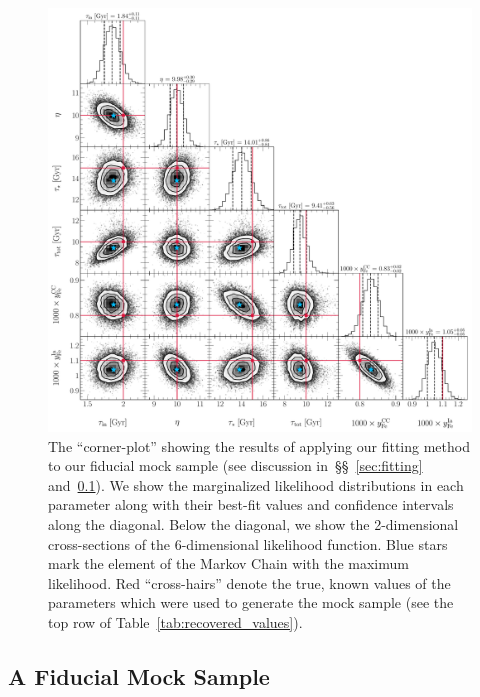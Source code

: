 \documentclass[ms.tex]{subfiles}
\begin{document}
\begin{figure}
\centering
\includegraphics[scale = 0.45]{fiducial_76k8.pdf}
\caption{
The ``corner-plot'' showing the results of applying our fitting method to our
fiducial mock sample (see discussion in~\S\S~\ref{sec:fitting}
and~\ref{sec:mocks:fiducial}).
We show the marginalized likelihood distributions in each parameter along with
their best-fit values and confidence intervals along the diagonal.
Below the diagonal, we show the 2-dimensional cross-sections of the
6-dimensional likelihood function.
Blue stars mark the element of the Markov Chain with the maximum likelihood.
Red ``cross-hairs'' denote the true, known values of the parameters which were
used to generate the mock sample (see the top row of
Table~\ref{tab:recovered_values}).
}
\label{fig:corner_fiducial}
\end{figure}

\subsection{A Fiducial Mock Sample}
\label{sec:mocks:fiducial}
\end{document}
